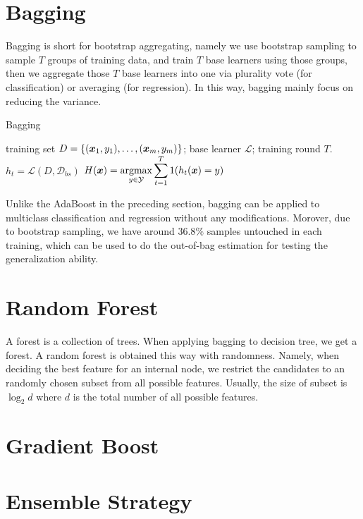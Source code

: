 \section{Bagging}
Bagging is short for bootstrap aggregating, namely we use bootstrap sampling to sample $T$ groups of training
data, and train $T$ base learners using those groups, then we aggregate those $T$ base learners into one via 
plurality vote (for classification) or averaging (for regression). In this way, bagging mainly focus on
reducing the variance.

\begin{algorithm}
    \caption{Bagging}\label{Bagging}
    \begin{algorithmic}[1]
        \Require training set $D = \{(\boldsymbol{x}_1, y_1), \dotsc, (\boldsymbol{x}_m, y_m)\}$; base learner $\mathcal{L}$;
        training round $T$.
            \State $h_t = \mathcal{L}(D, \mathcal{D}_{bs})$ 
        \EndFor
        \Ensure $H(\boldsymbol{x}) = \displaystyle\operatorname*{argmax}_{y\in \mathcal{Y}}\sum_{t=1}^T 1(h_t(\boldsymbol{x}) = y)$
    \end{algorithmic}
\end{algorithm}

Unlike the AdaBoost in the preceding section, bagging can be applied to multiclass classification and
regression without any modifications. Morover, due to bootstrap sampling, we have around $36.8\%$ samples
untouched in each training, which can be used to do the out-of-bag estimation for testing the generalization
ability.

\section{Random Forest}
A forest is a collection of trees. When applying bagging to decision tree, we get a forest. A random forest is
obtained this way with randomness. Namely, when deciding the best feature for an internal node, we restrict 
the candidates to an randomly chosen subset from all possible features. Usually, the size of subset is 
$\log_2 d$ where $d$ is the total number of all possible features.

\section{Gradient Boost}

\section{Ensemble Strategy}
